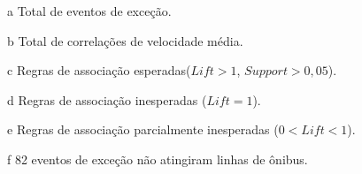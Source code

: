 \documentclass[
	12pt,				%
	oneside,			%
	a4paper,			%
	english,			%
	brazil				%
	]{abntex2ppgsi}
\begin{document}
{{\begin{apendicesenv}
\begin{table}[!htb]
\begin{threeparttable}
\begin{tablenotes}
            \item[a] Total de eventos de exceção.
            \item[b] Total de correlações de velocidade média.
            \item[c] Regras de associação esperadas($Lift > 1$, $Support > 0,05$).
            \item[d] Regras de associação inesperadas ($Lift = 1$).
            \item[e] Regras de associação parcialmente inesperadas ($0 < Lift < 1$).
            \item[f] 82 eventos de exceção não atingiram linhas de ônibus.
        \end{tablenotes}
\end{threeparttable}
\end{table}


\end{apendicesenv}}}
\end{document}
